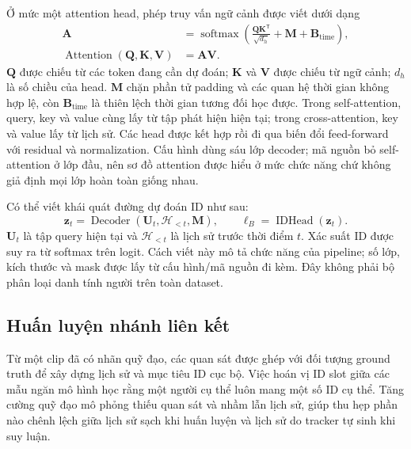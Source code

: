 Ở mức một attention head, phép truy vấn ngữ cảnh được viết dưới dạng
\begin{equation}
 \begin{aligned}
  \mathbf A&=\operatorname{softmax}\!\left(
  \frac{\mathbf Q\mathbf K^{\mathsf T}}{\sqrt{d_h}}
   +\mathbf M+\mathbf B_{\mathrm{time}}\right),\\
  \operatorname{Attention}(\mathbf Q,\mathbf K,\mathbf V)&=\mathbf A\mathbf V.
 \end{aligned}
 \label{eq:attention}
\end{equation}
$\mathbf Q$ được chiếu từ các token đang cần dự đoán; $\mathbf K$ và
$\mathbf V$ được chiếu từ ngữ cảnh; $d_h$ là số chiều của head.
$\mathbf M$ chặn phần tử padding và các quan hệ thời gian không hợp lệ,
còn $\mathbf B_{\mathrm{time}}$ là thiên lệch thời gian tương đối học được.
Trong self-attention, query, key và value cùng lấy từ tập phát hiện hiện tại;
trong cross-attention, key và value lấy từ lịch sử. Các head được kết hợp rồi
đi qua biến đổi feed-forward với residual và normalization. Cấu hình dùng sáu
lớp decoder; mã nguồn bỏ self-attention ở lớp đầu, nên sơ đồ attention được
hiểu ở mức chức năng chứ không giả định mọi lớp hoàn toàn giống nhau.

Có thể viết khái quát đường dự đoán ID như sau:
\begin{equation}
 \mathbf z_t=\operatorname{Decoder}(\mathbf U_t,\mathcal H_{<t},\mathbf M),
 \qquad \boldsymbol\ell_B=\operatorname{IDHead}(\mathbf z_t).
 \label{eq:id-decoder}
\end{equation}
$\mathbf U_t$ là tập query hiện tại và $\mathcal H_{<t}$ là lịch sử trước thời
điểm $t$. Xác suất ID được suy ra từ softmax trên logit. Cách viết này mô tả
chức năng của pipeline; số lớp, kích thước và mask được lấy từ cấu hình/mã
nguồn đi kèm. Đây không phải bộ phân loại danh tính người trên toàn dataset.

\FloatBarrier
\subsection{Huấn luyện nhánh liên kết}
Từ một clip đã có nhãn quỹ đạo, các quan sát được ghép với đối tượng ground truth để xây dựng lịch sử và mục tiêu ID cục bộ. Việc hoán vị ID slot giữa các mẫu ngăn mô hình học rằng một người cụ thể luôn mang một số ID cụ thể. Tăng cường quỹ đạo mô phỏng thiếu quan sát và nhầm lẫn lịch sử, giúp thu hẹp phần nào chênh lệch giữa lịch sử sạch khi huấn luyện và lịch sử do tracker tự sinh khi suy luận.

